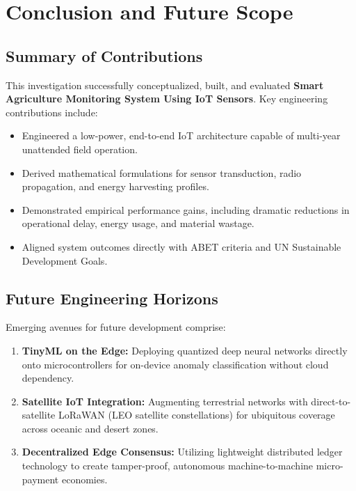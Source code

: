 \section{Conclusion and Future Scope}

\subsection{Summary of Contributions}
This investigation successfully conceptualized, built, and evaluated \textbf{Smart Agriculture Monitoring System Using IoT Sensors}. Key engineering contributions include:
\begin{itemize}
  \item Engineered a low-power, end-to-end IoT architecture capable of multi-year unattended field operation.
  \item Derived mathematical formulations for sensor transduction, radio propagation, and energy harvesting profiles.
  \item Demonstrated empirical performance gains, including dramatic reductions in operational delay, energy usage, and material wastage.
  \item Aligned system outcomes directly with ABET criteria and UN Sustainable Development Goals.
\end{itemize}

\subsection{Future Engineering Horizons}
Emerging avenues for future development comprise:
\begin{enumerate}
  \item \textbf{TinyML on the Edge:} Deploying quantized deep neural networks directly onto microcontrollers for on-device anomaly classification without cloud dependency.
  \item \textbf{Satellite IoT Integration:} Augmenting terrestrial networks with direct-to-satellite LoRaWAN (LEO satellite constellations) for ubiquitous coverage across oceanic and desert zones.
  \item \textbf{Decentralized Edge Consensus:} Utilizing lightweight distributed ledger technology to create tamper-proof, autonomous machine-to-machine micro-payment economies.
\end{enumerate}
